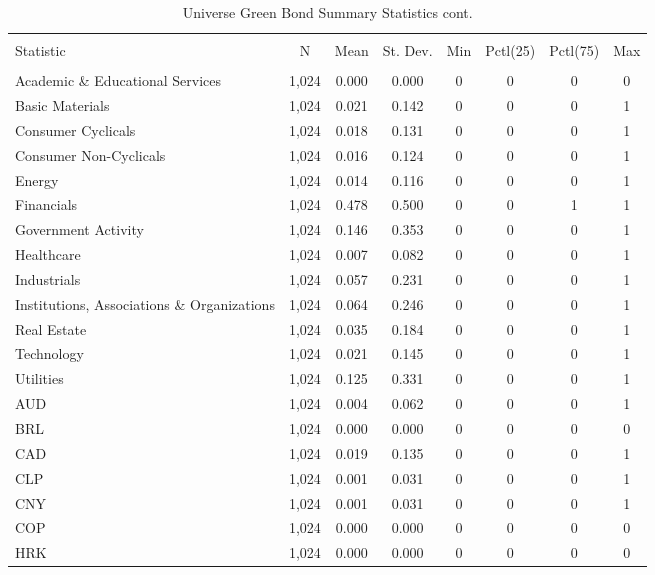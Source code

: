 \begin{table}[!htbp] \centering 
  \caption{Universe Green Bond Summary Statistics cont.} 
  \label{} 
  \footnotesize
\begin{tabular}{@{\extracolsep{5pt}}lccccccc} 
\\[-1.8ex]\hline 
\hline \\[-1.8ex] 
Statistic & \multicolumn{1}{c}{N} & \multicolumn{1}{c}{Mean} & \multicolumn{1}{c}{St. Dev.} & \multicolumn{1}{c}{Min} & \multicolumn{1}{c}{Pctl(25)} & \multicolumn{1}{c}{Pctl(75)} & \multicolumn{1}{c}{Max} \\ 
\hline \\[-1.8ex] 
Academic \& Educational Services & 1,024 & 0.000 & 0.000 & 0 & 0 & 0 & 0 \\ 
Basic Materials & 1,024 & 0.021 & 0.142 & 0 & 0 & 0 & 1 \\ 
Consumer Cyclicals & 1,024 & 0.018 & 0.131 & 0 & 0 & 0 & 1 \\ 
Consumer Non-Cyclicals & 1,024 & 0.016 & 0.124 & 0 & 0 & 0 & 1 \\ 
Energy & 1,024 & 0.014 & 0.116 & 0 & 0 & 0 & 1 \\ 
Financials & 1,024 & 0.478 & 0.500 & 0 & 0 & 1 & 1 \\ 
Government Activity & 1,024 & 0.146 & 0.353 & 0 & 0 & 0 & 1 \\ 
Healthcare & 1,024 & 0.007 & 0.082 & 0 & 0 & 0 & 1 \\ 
Industrials & 1,024 & 0.057 & 0.231 & 0 & 0 & 0 & 1 \\ 
Institutions, Associations \& Organizations & 1,024 & 0.064 & 0.246 & 0 & 0 & 0 & 1 \\ 
Real Estate & 1,024 & 0.035 & 0.184 & 0 & 0 & 0 & 1 \\ 
Technology & 1,024 & 0.021 & 0.145 & 0 & 0 & 0 & 1 \\ 
Utilities & 1,024 & 0.125 & 0.331 & 0 & 0 & 0 & 1 \\ 
AUD & 1,024 & 0.004 & 0.062 & 0 & 0 & 0 & 1 \\ 
BRL & 1,024 & 0.000 & 0.000 & 0 & 0 & 0 & 0 \\ 
CAD & 1,024 & 0.019 & 0.135 & 0 & 0 & 0 & 1 \\ 
CLP & 1,024 & 0.001 & 0.031 & 0 & 0 & 0 & 1 \\ 
CNY & 1,024 & 0.001 & 0.031 & 0 & 0 & 0 & 1 \\ 
COP & 1,024 & 0.000 & 0.000 & 0 & 0 & 0 & 0 \\ 
HRK & 1,024 & 0.000 & 0.000 & 0 & 0 & 0 & 0 \\ 

\end{tabular}
\end{table}
